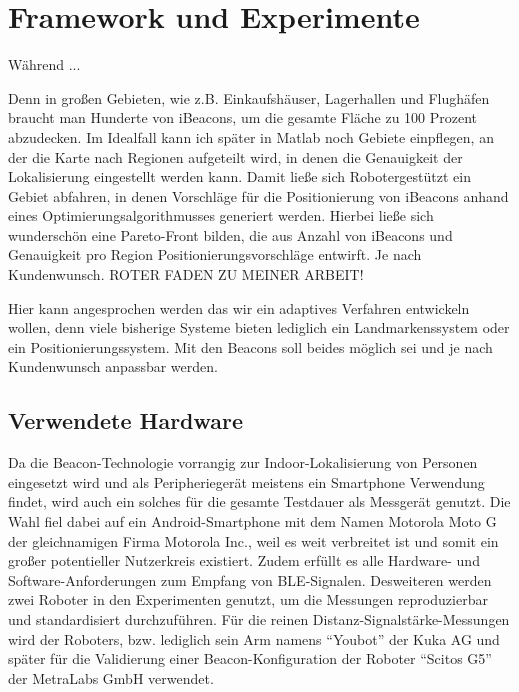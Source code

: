 \chapter{Framework und Experimente}
Während ...

Denn in großen Gebieten, wie z.B. Einkaufshäuser, Lagerhallen und Flughäfen braucht man Hunderte von iBeacons, um die gesamte Fläche zu 100 Prozent abzudecken. Im Idealfall kann ich später in Matlab noch Gebiete einpflegen, an der die Karte nach Regionen aufgeteilt wird, in denen die Genauigkeit der Lokalisierung eingestellt werden kann. Damit ließe sich Robotergestützt ein Gebiet abfahren, in denen Vorschläge für die Positionierung von iBeacons anhand eines Optimierungsalgorithmusses generiert werden. Hierbei ließe sich wunderschön eine Pareto-Front bilden, die aus Anzahl von iBeacons und Genauigkeit pro Region Positionierungsvorschläge entwirft. Je nach Kundenwunsch. ROTER FADEN ZU MEINER ARBEIT!

Hier kann angesprochen werden das wir ein adaptives Verfahren entwickeln wollen, denn viele bisherige Systeme bieten lediglich ein Landmarkenssystem oder ein Positionierungssystem. Mit den Beacons soll beides möglich sei und je nach Kundenwunsch anpassbar werden.

\section{Verwendete Hardware}
Da die Beacon-Technologie vorrangig zur Indoor-Lokalisierung von Personen eingesetzt wird und als Peripheriegerät meistens ein Smartphone Verwendung findet, wird auch ein solches für die gesamte Testdauer als Messgerät genutzt. Die Wahl fiel dabei auf ein Android-Smartphone mit dem Namen Motorola Moto G der gleichnamigen Firma Motorola Inc., weil es weit verbreitet ist und somit ein großer potentieller Nutzerkreis existiert. Zudem erfüllt es alle Hardware- und Software-Anforderungen zum Empfang von BLE-Signalen. Desweiteren werden zwei Roboter in den Experimenten genutzt, um die Messungen reproduzierbar und standardisiert durchzuführen. Für die reinen Distanz-Signalstärke-Messungen wird der Roboters, bzw. lediglich sein Arm namens "`Youbot"' der Kuka AG und später für die Validierung einer Beacon-Konfiguration der Roboter "`Scitos G5"' der MetraLabs GmbH verwendet. 
